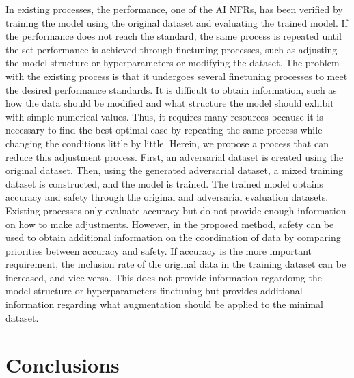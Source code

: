\documentclass[journal,article,submit,moreauthors,pdftex]{Definitions/mdpi}
\begin{document}
In existing processes, the performance, one of the AI NFRs, has been verified by training the model using the original dataset and evaluating the trained model.
If the performance does not reach the standard, the same process is repeated until the set performance is achieved through finetuning processes, such as adjusting the model structure or hyperparameters or modifying the dataset.
The problem with the existing process is that it undergoes several finetuning processes to meet the desired performance standards.
It is difficult to obtain information, such as how the data should be modified and what structure the model should exhibit with simple numerical values.
Thus, it requires many resources because it is necessary to find the best optimal case by repeating the same process while changing the conditions little by little.
Herein, we propose a process that can reduce this adjustment process.
First, an adversarial dataset is created using the original dataset.
Then, using the generated adversarial dataset, a mixed training dataset is constructed, and the model is trained.
The trained model obtains accuracy and safety through the original and adversarial evaluation datasets.
Existing processes only evaluate accuracy but do not provide enough information on how to make adjustments.
However, in the proposed method, safety can be used to obtain additional information on the coordination of data by comparing priorities between accuracy and safety.
If accuracy is the more important requirement, the inclusion rate of the original data in the training dataset can be increased, and vice versa.
This does not provide information regardomg the model structure or hyperparameters finetuning but provides additional information regarding what augmentation should be applied to the minimal dataset.

\section{Conclusions}
\end{document}

